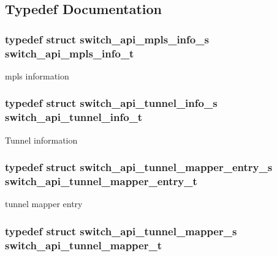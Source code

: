\subsection{Typedef Documentation}
\hypertarget{group__Tunnel_gab183bce9dc3bd5f8baa23b589e040674}{
\subsubsection[{switch\+\_\+api\+\_\+mpls\+\_\+info\+\_\+t}]{\setlength{\rightskip}{0pt plus 5cm}typedef struct {\bf switch\+\_\+api\+\_\+mpls\+\_\+info\+\_\+s}  {\bf switch\+\_\+api\+\_\+mpls\+\_\+info\+\_\+t}}}\label{group__Tunnel_gab183bce9dc3bd5f8baa23b589e040674}
mpls information \hypertarget{group__Tunnel_ga9c4faabdbd4426a0e9903279ad118116}{
\subsubsection[{switch\+\_\+api\+\_\+tunnel\+\_\+info\+\_\+t}]{\setlength{\rightskip}{0pt plus 5cm}typedef struct {\bf switch\+\_\+api\+\_\+tunnel\+\_\+info\+\_\+s}  {\bf switch\+\_\+api\+\_\+tunnel\+\_\+info\+\_\+t}}}\label{group__Tunnel_ga9c4faabdbd4426a0e9903279ad118116}
Tunnel information \hypertarget{group__Tunnel_gadb6058730695240a36e37a65dbc20e8b}{
\subsubsection[{switch\+\_\+api\+\_\+tunnel\+\_\+mapper\+\_\+entry\+\_\+t}]{\setlength{\rightskip}{0pt plus 5cm}typedef struct {\bf switch\+\_\+api\+\_\+tunnel\+\_\+mapper\+\_\+entry\+\_\+s}  {\bf switch\+\_\+api\+\_\+tunnel\+\_\+mapper\+\_\+entry\+\_\+t}}}\label{group__Tunnel_gadb6058730695240a36e37a65dbc20e8b}
tunnel mapper entry \hypertarget{group__Tunnel_gabce2bf13973701d284cb4c173ee4d9d7}{
\subsubsection[{switch\+\_\+api\+\_\+tunnel\+\_\+mapper\+\_\+t}]{\setlength{\rightskip}{0pt plus 5cm}typedef struct {\bf switch\+\_\+api\+\_\+tunnel\+\_\+mapper\+\_\+s}  {\bf switch\+\_\+api\+\_\+tunnel\+\_\+mapper\+\_\+t}}}\label{group__Tunnel_gabce2bf13973701d284cb4c173ee4d9d7}

